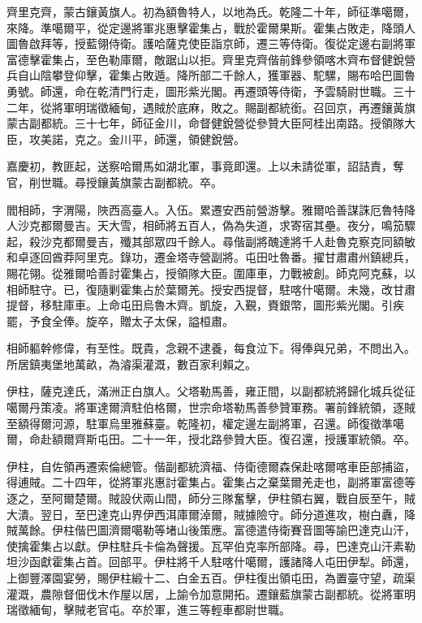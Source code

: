 \begin{pinyinscope}
齊里克齊，蒙古鑲黃旗人。初為額魯特人，以地為氏。乾隆二十年，師征準噶爾，來降。準噶爾平，從定邊將軍兆惠擊霍集占，戰於霍爾果斯。霍集占敗走，降頭人圖魯啟拜等，授藍翎侍衛。護哈薩克使臣詣京師，遷三等侍衛。復從定邊右副將軍富德擊霍集占，至色勒庫爾，敵踞山以拒。齊里克齊偕前鋒參領喀木齊布督健銳營兵自山陰攀登仰擊，霍集占敗遁。降所部二千餘人，獲軍器、駝騾，賜布哈巴圖魯勇號。師還，命在乾清門行走，圖形紫光閣。再遷頭等侍衛，予雲騎尉世職。三十二年，從將軍明瑞徵緬甸，遇賊於底麻，敗之。賜副都統銜。召回京，再遷鑲黃旗蒙古副都統。三十七年，師征金川，命督健銳營從參贊大臣阿桂出南路。授領隊大臣，攻美諾，克之。金川平，師還，領健銳營。

嘉慶初，教匪起，送察哈爾馬如湖北軍，事竟即還。上以未請從軍，詔詰責，奪官，削世職。尋授鑲黃旗蒙古副都統。卒。

閻相師，字渭陽，陜西高臺人。入伍。累遷安西前營游擊。雅爾哈善謀誅厄魯特降人沙克都爾曼吉。天大雪，相師將五百人，偽為失道，求寄宿其壘。夜分，鳴笳驟起，殺沙克都爾曼吉，殲其部眾四千餘人。尋偕副將醜達將千人赴魯克察克同額敏和卓逐回酋莽阿里克。錄功，遷金塔寺營副將。屯田吐魯番。擢甘肅肅州鎮總兵，賜花翎。從雅爾哈善討霍集占，授領隊大臣。圍庫車，力戰被創。師克阿克蘇，以相師駐守。已，復隨剿霍集占於葉爾羌。授安西提督，駐喀什噶爾。未幾，改甘肅提督，移駐庫車。上命屯田烏魯木齊。凱旋，入覲，賚銀幣，圖形紫光閣。引疾罷，予食全俸。旋卒，贈太子太保，謚桓肅。

相師軀幹修偉，有至性。既貴，念親不逮養，每食泣下。得俸與兄弟，不問出入。所居鎮夷堡地萬畝，為濬渠灌溉，數百家利賴之。

伊柱，薩克達氏，滿洲正白旗人。父塔勒馬善，雍正間，以副都統將歸化城兵從征噶爾丹策凌。將軍達爾濟駐伯格爾，世宗命塔勒馬善參贊軍務。署前鋒統領，逐賊至額得爾河源，駐軍烏里雅蘇臺。乾隆初，權定邊左副將軍，召還。師復徵準噶爾，命赴額爾齊斯屯田。二十一年，授北路參贊大臣。復召還，授護軍統領。卒。

伊柱，自佐領再遷索倫總管。偕副都統濟福、侍衛德爾森保赴喀爾喀車臣部捕盜，得逋賊。二十四年，從將軍兆惠討霍集占。霍集占之棄葉爾羌走也，副將軍富德等逐之，至阿爾楚爾。賊設伏兩山間，師分三隊奮擊，伊柱領右翼，戰自辰至午，賊大潰。翌日，至巴達克山界伊西洱庫爾淖爾，賊據險守。師分道進攻，樹白纛，降賊萬餘。伊柱偕巴圖濟爾噶勒等堵山後策應。富德遣侍衛賽音圖等諭巴達克山汗，使擒霍集占以獻。伊柱駐兵卡倫為聲援。瓦罕伯克率所部降。尋，巴達克山汗素勒坦沙函獻霍集占首。回部平。伊柱將千人駐喀什噶爾，護諸降人屯田伊犁。師還，上御豐澤園宴勞，賜伊柱緞十二、白金五百。伊柱復出領屯田，為置臺守望，疏渠灌溉，農隙督佃伐木作屋以居，上諭令加意開拓。遷鑲藍旗蒙古副都統。從將軍明瑞徵緬甸，擊賊老官屯。卒於軍，進三等輕車都尉世職。


\end{pinyinscope}
